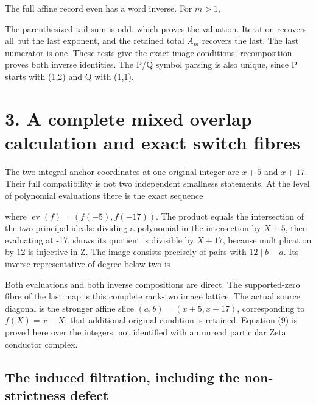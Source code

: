 The full affine record even has a word inverse. For \(m>1\),


The parenthesized tail sum is odd, which proves the valuation. Iteration
recovers all but the last exponent, and the retained total \(A_m\)
recovers the last. The last numerator is one. These tests give the exact
image conditions; recomposition proves both inverse identities. The P/Q
symbol parsing is also unique, since P starts with (1,2) and Q with
(1,1).

\section{3. A complete mixed overlap calculation and exact switch
fibres}

The two integral anchor coordinates at one original integer are \(x+5\)
and \(x+17\). Their full compatibility is not two independent smallness
statements. At the level of polynomial evaluations there is the exact
sequence


where \(\operatorname{ev}(f)=(f(-5),f(-17))\). The product equals the
intersection of the two principal ideals: dividing a polynomial in the
intersection by \(X+5\), then evaluating at -17, shows its quotient is
divisible by \(X+17\), because multiplication by 12 is injective in Z.
The image consists precisely of pairs with \(12\mid b-a\). Its inverse
representative of degree below two is


Both evaluations and both inverse compositions are direct. The
supported-zero fibre of the last map is this complete rank-two image
lattice. The actual source diagonal is the stronger affine slice
\((a,b)=(x+5,x+17)\), corresponding to \(f(X)=x-X\); that additional
original condition is retained. Equation (9) is proved here over the
integers, not identified with an unread particular Zeta conductor
complex.

\subsection{The induced filtration, including the non-strictness defect}

